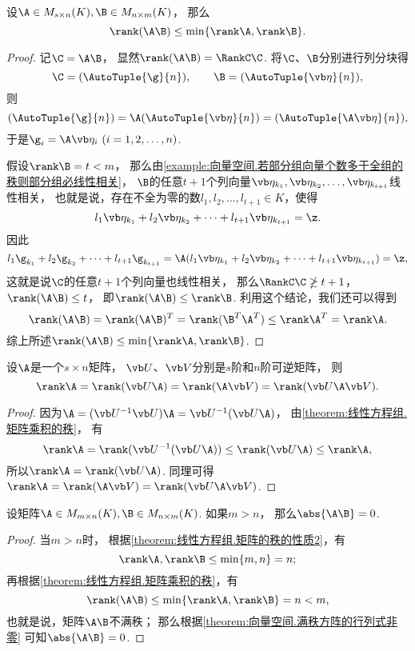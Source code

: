 \begin{theorem}\label{theorem:线性方程组.矩阵乘积的秩}
设\(\A\in M_{s\times n}(K),
\B\in M_{n\times m}(K)\)，
那么\[
	\rank(\A\B) \leq \min\{\rank\A,\rank\B\}.
\]
\begin{proof}
记\(\C = \A\B\)，
显然\(\rank(\A\B)=\RankC\C\).
将\(\C\)、\(\B\)分别进行列分块得\[
	\C = (\AutoTuple{\g}{n}),
	\qquad
	\B = (\AutoTuple{\b}{n}),
\]
则\[
	(\AutoTuple{\g}{n}) = \A (\AutoTuple{\b}{n}) = (\AutoTuple{\A\b}{n}),
\]
于是\(\g_i = \A \b_i\ (i=1,2,\dotsc,n)\).

假设\(\rank\B = t<m\)，
那么由\cref{example:向量空间.若部分组向量个数多于全组的秩则部分组必线性相关}，
\(\B\)的任意\(t+1\)个列向量\(\b_{k_1},\b_{k_2},\dotsc,\b_{k_{t+1}}\)线性相关，
也就是说，存在不全为零的数\(l_1,l_2,\dotsc,l_{t+1}\in K\)，使得\[
	l_1 \b_{k_1} + l_2 \b_{k_2} + \dotsb + l_{t+1} \b_{k_{t+1}} = \z.
\]
因此\[
	l_1 \g_{k_1} + l_2 \g_{k_2} + \dotsb + l_{t+1} \g_{k_{t+1}}
	= \A(l_1 \b_{k_1} + l_2 \b_{k_2} + \dotsb + l_{t+1} \b_{k_{t+1}})
	= \z,
\]
这就是说\(\C\)的任意\(t+1\)个列向量也线性相关，
那么\(\RankC\C \ngeq t+1\)，
\(\rank(\A\B)\leq t\)，
即\(\rank(\A\B) \leq \rank\B\).
利用这个结论，我们还可以得到\[
	\rank(\A\B)
	= \rank(\A\B)^T
	= \rank(\B^T \A^T)
	\leq \rank \A^T
	= \rank \A.
\]
综上所述\(\rank(\A\B) \leq \min\{\rank\A,\rank\B\}\).
\end{proof}
\end{theorem}

\begin{corollary}
设\(\A\)是一个\(s \times n\)矩阵，
\(\P\)、\(\Q\)分别是\(s\)阶和\(n\)阶可逆矩阵，
则\[
	\rank\A = \rank(\P\A) = \rank(\A\Q) = \rank(\P\A\Q).
\]
\begin{proof}
因为\(\A = (\P^{-1} \P) \A = \P^{-1} (\P \A)\)，
由\cref{theorem:线性方程组.矩阵乘积的秩}，
有\[
	\rank\A = \rank(\P^{-1}(\P\A)) \leq \rank(\P\A) \leq \rank\A,
\]
所以\(\rank\A = \rank(\P\A)\).
同理可得\(\rank\A = \rank(\A\Q) = \rank(\P\A\Q)\).
\end{proof}
\end{corollary}

\begin{theorem}
设矩阵\(\A \in M_{m \times n}(K),
\B \in M_{n \times m}(K)\).
如果\(m > n\)，
那么\(\abs{\A\B} = 0\).
\begin{proof}
当\(m>n\)时，
根据\cref{theorem:线性方程组.矩阵的秩的性质2}，有\[
	\rank\A,\rank\B \leq \min\{m,n\} = n;
\]
再根据\cref{theorem:线性方程组.矩阵乘积的秩}，有\[
	\rank(\A\B) \leq \min\{\rank\A,\rank\B\} = n < m,
\]
也就是说，矩阵\(\A\B\)不满秩；
那么根据\cref{theorem:向量空间.满秩方阵的行列式非零} 可知\(\abs{\A\B} = 0\).
\end{proof}
\end{theorem}

